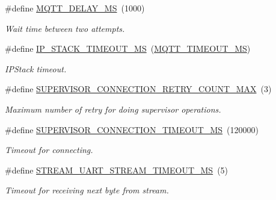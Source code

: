 \begin{DoxyCompactItemize}
\mbox{\label{rmap-config_8h_a4a9d04eab0c57e3143a6d1be60b73fb3}} 
\#define \hyperlink{rmap-config_8h_a4a9d04eab0c57e3143a6d1be60b73fb3}{M\+Q\+T\+T\+\_\+\+D\+E\+L\+A\+Y\+\_\+\+MS}~(1000)
\begin{DoxyCompactList}\small\item\em Wait time between two attempts. \end{DoxyCompactList}\item 
\mbox{\label{rmap-config_8h_a578ee6f26618a9f795fb5828663431f0}} 
\#define \hyperlink{rmap-config_8h_a578ee6f26618a9f795fb5828663431f0}{I\+P\+\_\+\+S\+T\+A\+C\+K\+\_\+\+T\+I\+M\+E\+O\+U\+T\+\_\+\+MS}~(\hyperlink{mqtt__config_8h_abfcc7e625e42a553de9c3132faef282b}{M\+Q\+T\+T\+\_\+\+T\+I\+M\+E\+O\+U\+T\+\_\+\+MS})
\begin{DoxyCompactList}\small\item\em I\+P\+Stack timeout. \end{DoxyCompactList}\item 
\mbox{\label{rmap-config_8h_a8c44e74b589622bd3a3c69bfdc754a3b}} 
\#define \hyperlink{rmap-config_8h_a8c44e74b589622bd3a3c69bfdc754a3b}{S\+U\+P\+E\+R\+V\+I\+S\+O\+R\+\_\+\+C\+O\+N\+N\+E\+C\+T\+I\+O\+N\+\_\+\+R\+E\+T\+R\+Y\+\_\+\+C\+O\+U\+N\+T\+\_\+\+M\+AX}~(3)
\begin{DoxyCompactList}\small\item\em Maximum number of retry for doing supervisor operations. \end{DoxyCompactList}\item 
\mbox{\label{rmap-config_8h_a52ca4538c4f04d08d9b1f35329926912}} 
\#define \hyperlink{rmap-config_8h_a52ca4538c4f04d08d9b1f35329926912}{S\+U\+P\+E\+R\+V\+I\+S\+O\+R\+\_\+\+C\+O\+N\+N\+E\+C\+T\+I\+O\+N\+\_\+\+T\+I\+M\+E\+O\+U\+T\+\_\+\+MS}~(120000)
\begin{DoxyCompactList}\small\item\em Timeout for connecting. \end{DoxyCompactList}\item 
\mbox{\label{rmap-config_8h_aa5742869009a8ff3a6e3dfcb700f3ab6}} 
\#define \hyperlink{rmap-config_8h_aa5742869009a8ff3a6e3dfcb700f3ab6}{S\+T\+R\+E\+A\+M\+\_\+\+U\+A\+R\+T\+\_\+\+S\+T\+R\+E\+A\+M\+\_\+\+T\+I\+M\+E\+O\+U\+T\+\_\+\+MS}~(5)
\begin{DoxyCompactList}\small\item\em Timeout for receiving next byte from stream. \end{DoxyCompactList}\item 

\end{DoxyCompactItemize}

